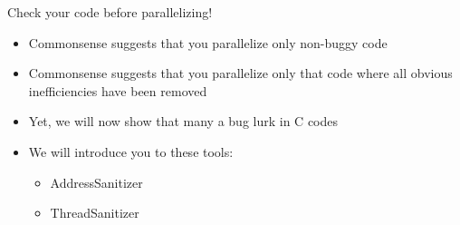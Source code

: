 \documentclass{beamer}
\begin{document}

\begin{frame}[fragile]{Check your code before parallelizing!}

  \begin{itemize}
  \item Commonsense suggests that you parallelize only non-buggy code
  \item Commonsense suggests that you parallelize only that code
    where all obvious inefficiencies have been removed
  \item Yet, we will now show that many a bug lurk in C codes
  \item We will introduce you to these tools:
    \begin{itemize}
    \item AddressSanitizer
    \item ThreadSanitizer
    \end{itemize}
  \end{itemize}
  
\end{frame}


\end{document}
